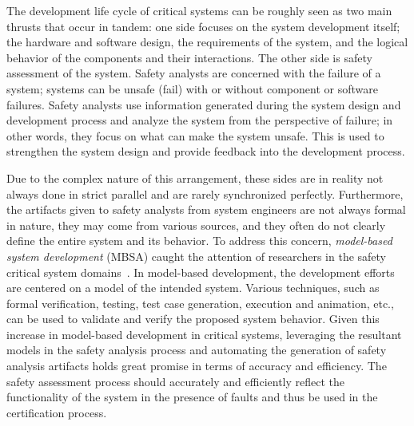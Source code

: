 The development life cycle of critical systems can be roughly seen as two main thrusts that occur in tandem: one side focuses on the system development itself; the hardware and software design, the requirements of the system, and the logical behavior of the components and their interactions. The other side is safety assessment of the system. Safety analysts are concerned with the failure of a system; systems can be unsafe (fail) with or without component or software failures. Safety analysts use information generated during the system design and development process and analyze the system from the perspective of failure; in other words, they focus on what can make the system unsafe. This is used to strengthen the system design and provide feedback into the development process.

Due to the complex nature of this arrangement, these sides are in reality not always done in strict parallel and are rarely synchronized perfectly. Furthermore, the artifacts given to safety analysts from system engineers are not always formal in nature, they may come from various sources, and they often do not clearly define the entire system and its behavior. To address this concern, \emph{model-based system development} (MBSA) caught the attention of researchers in the safety critical system domains~\cite{Joshi05:Dasc,CAV2015:BoCiGrMa,info17:HaLuHo,5979344,Gudemann:2010:FQQ:1909626.1909813}. In model-based development, the development efforts are centered on a model of the intended system. Various techniques, such as formal verification, testing, test case generation, execution and animation, etc., can be used to validate and verify the proposed system behavior. Given this increase in model-based development in critical systems, leveraging the resultant models in the safety analysis process and automating the generation of safety analysis artifacts holds great promise in terms of accuracy and efficiency. The safety assessment process should accurately and efficiently reflect the functionality of the system in the presence of faults and thus be used in the certification process. 



